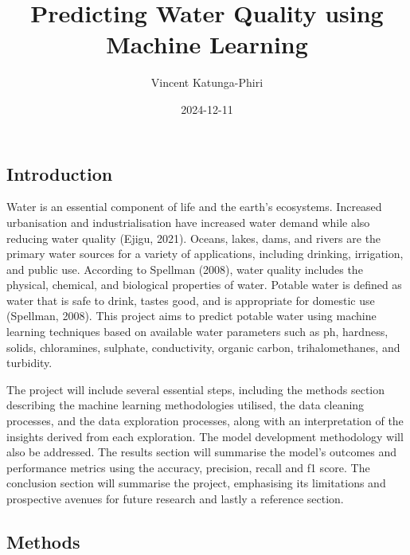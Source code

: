 \documentclass[
]{article}
\title{Predicting Water Quality using Machine Learning}
\author{Vincent Katunga-Phiri}
\date{2024-12-11}
\begin{document}
\maketitle

\subsection{Introduction}\label{introduction}

Water is an essential component of life and the earth's ecosystems.
Increased urbanisation and industrialisation have increased water demand
while also reducing water quality (Ejigu, 2021). Oceans, lakes, dams,
and rivers are the primary water sources for a variety of applications,
including drinking, irrigation, and public use. According to Spellman
(2008), water quality includes the physical, chemical, and biological
properties of water. Potable water is defined as water that is safe to
drink, tastes good, and is appropriate for domestic use (Spellman,
2008). This project aims to predict potable water using machine learning
techniques based on available water parameters such as ph, hardness,
solids, chloramines, sulphate, conductivity, organic carbon,
trihalomethanes, and turbidity.

The project will include several essential steps, including the methods
section describing the machine learning methodologies utilised, the data
cleaning processes, and the data exploration processes, along with an
interpretation of the insights derived from each exploration. The model
development methodology will also be addressed. The results section will
summarise the model's outcomes and performance metrics using the
accuracy, precision, recall and f1 score. The conclusion section will
summarise the project, emphasising its limitations and prospective
avenues for future research and lastly a reference section.

\subsection{Methods}\label{methods}
\end{document}
